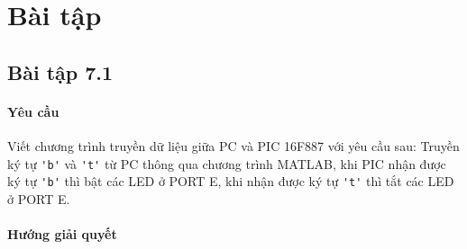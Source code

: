 \section{Bài tập}
\subsection{Bài tập 7.1}
\paragraph{Yêu cầu}Viết chương trình truyền dữ liệu giữa PC và PIC 16F887 với yêu cầu sau:
Truyền ký tự \verb|'b'| và \verb|'t'| từ PC thông qua chương trình MATLAB, khi PIC nhận được ký tự \verb|'b'| thì bật các LED ở PORT E, khi nhận được ký tự \verb|'t'| thì tắt các LED ở PORT E.
\paragraph{Hướng giải quyết}
